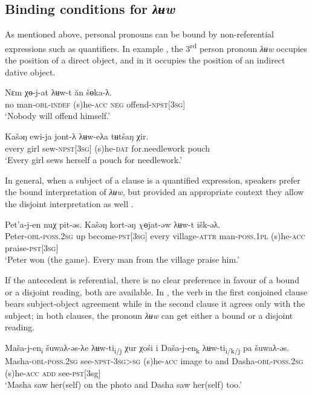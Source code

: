 \documentclass[output=paper]{langscibook}
\begin{document}
\subsection{{Binding} {conditions} {for} {\textit{λʉw}}}\label{sec:Volkova:3.3}

As mentioned above, personal pronouns can be bound by non-referential expressions such as quantifiers. In example , the 3\textsuperscript{rd} person pronoun \textit{λʉw} occupies the position of a direct object, and in  it %
occupies the position of an indirect dative object.

\ea 
\label{ex:Volkova:26}
 \gll Nɛm χɵ-j-at λʉw-t ăn šɵka-λ.\\
 no man-\textsc{obl-indef} (s)he\textsc{{}-acc neg} offend\textsc{{}-npst[3sg]}\\
 \glt ‘Nobody will offend himself.’
\z

 
 \ea 
\label{ex:Volkova:27}
 \gll Kašəŋ ewi-ja jont-λ  λʉw-eλa tʉtśaŋ  χir.\\
 every girl sew\textsc{{}-npst[3sg]} (s)he\textsc{{}-dat} for.needlework pouch\\
 \glt ‘Every girl sews herself a pouch for needlework.’
\z




In general, when a subject of a clause is a quantified expression, speakers prefer the bound interpretation of \textit{λʉw}, but provided an appropriate context they allow the disjoint interpretation as well . 

\ea 
\label{ex:Volkova:28}
 \gll Pet’a-j-en nuχ pit-əs.  Kašəŋ kort-əŋ $\chi ɵ$jat-əw λʉw-t išk-əλ.\\
 Peter-\textsc{obl-poss.2sg} up become-\textsc{pst[3sg}] every village\textsc{{}-attr} man\textsc{{}-poss.1pl} (s)he\textsc{{}-acc} praise-\textsc{pst[3sg]}\\
 \glt ‘Peter won (the game). Every man from the village praise him.’
\z


If the antecedent is referential, there is no clear preference in favour of a bound or a disjoint reading, both are available. In , the verb in the first conjoined clause bears subject-object agreement while in the second clause it agrees only with the subject; in both clauses, the pronoun \textit{λʉw} can get either a bound or a disjoint reading.

\ea 
\label{ex:Volkova:29}
 \gll Maša-j-en\textsubscript{i} šuwaλ-əs-λe λʉw-ti\textsubscript{i/j} χur χośi i Daša-j-en\textsubscript{k} λʉw-ti\textsubscript{i/k/j} pa šuwaλ-əs.\\
 Masha\textsc{{}-obl-poss.2sg} see\textsc{{}-npst-3sg>sg} (s)he\textsc{{}-acc} image to and Dasha\textsc{{}-obl-poss.2sg} (s)he\textsc{{}-acc} \textsc{add} see\textsc{{}-pst[}3sg] 
\\
 \glt ‘Masha saw her(self) on the photo and Dasha saw her(self) too.’
\z
\end{document}
